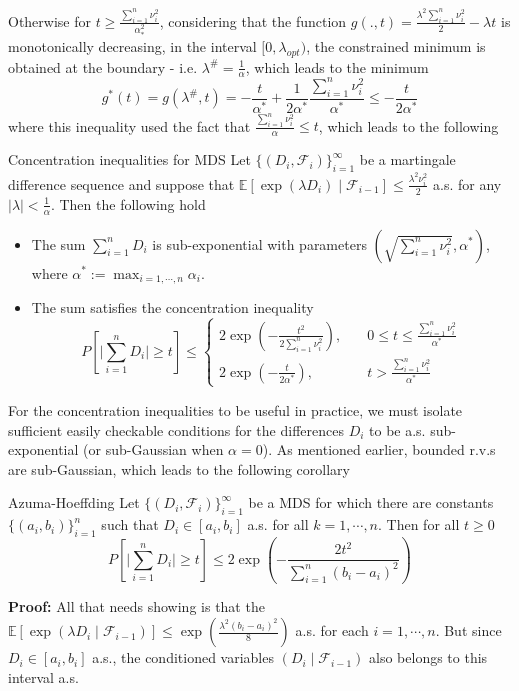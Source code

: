 \documentclass[10pt,handout,english]{beamer}
\newcommand{\E}{\mathbb{E}}
\newcommand{\F}{\mathcal{F}}
\newcommand{\1}{\mathbbm{1}}
\begin{document}
\begin{frame}[allowframebreaks]
Otherwise for $t\geq\frac{\sum_{i=1}^n\nu_i^2}{\alpha_*^2}$, considering that the function $g(.,t)=\frac{\lambda^2\sum_{i=1}^{n}\nu_i^2}{2}-\lambda t$ is monotonically decreasing, in the interval $[0,\lambda_{opt})$, the constrained minimum
is obtained at the boundary - i.e. $\lambda^\#=\frac{1}{\alpha}$, which leads to the minimum
\[
g^*(t)=g(\lambda^\#,t)=-\frac{t}{\alpha^*}+\frac{1}{2\alpha^*}\frac{\sum_{i=1}^{n}\nu_i^2}{\alpha^*}\leq-\frac{t}{2\alpha^*}
\]
where this inequality used the fact that $\frac{\sum_{i=1}^{n}\nu_i^2}{\alpha}\leq t$, which leads to the following
\begin{block}{Concentration inequalities for MDS}
Let $\{(D_i,\F_i)\}_{i=1}^{\infty}$ be a martingale difference sequence and suppose that $\E[\exp(\lambda D_i)\mid\F_{i-1}]\leq\frac{\lambda^2\nu_i^2}{2}$ a.s. for any $\lvert\lambda\rvert<\frac{1}{\alpha}$. Then the following hold
\begin{itemize}
\item The sum $\sum_{i=1}^{n}D_i$ is sub-exponential with parameters $\left(\sqrt{\sum_{i=1}^{n}\nu_i^2},\alpha^*\right)$, where $\alpha^*:=\max_{i=1,\cdots,n}\alpha_i$.
\item The sum satisfies the concentration inequality
\[
P\left[\biggl\vert \sum\limits_{i=1}^nD_i\biggr\vert\geq t\right]\leq
\begin{cases}
2\exp\left(-\frac{t^2}{2\sum_{i=1}^{n}\nu_i^2}\right),\quad &0\leq t\leq\frac{\sum_{i=1}^{n}\nu_i^2}{\alpha^*}\\
2\exp\left(-\frac{t}{2\alpha^*}\right),\quad &t>\frac{\sum_{i=1}^{n}\nu_i^2}{\alpha^*}
\end{cases}
\]
\end{itemize}
\end{block}
For the concentration inequalities to be useful in practice, we must isolate sufficient easily checkable conditions for the differences $D_i$ to be a.s. sub-exponential (or sub-Gaussian when $\alpha=0$). As mentioned earlier, bounded r.v.s are sub-Gaussian, which leads to the following corollary
\begin{block}{Azuma-Hoeffding}
Let $\{(D_i,\F_i)\}_{i=1}^{\infty}$ be a MDS for which there are constants $\{(a_i,b_i)\}_{i=1}^n$ such that $D_i\in[a_i,b_i]$ a.s. for all $k=1,\cdots,n$. Then for all $t\geq0$
\[
P\left[\biggl\vert\sum\limits_{i=1}^{n}D_i\biggr\vert\geq t\right]\leq2\exp\left(-\frac{2t^2}{\sum_{i=1}^{n}(b_i-a_i)^2}\right)
\]
\end{block}

\textbf{Proof:}
All that needs showing is that the $\E[\exp(\lambda D_i\mid\F_{i-1})]\leq\exp\left(\frac{\lambda^2(b_i-a_i)^2}{8}\right)$ a.s. for each $i=1,\cdots,n$. But since $D_i\in[a_i,b_i]$ a.s., the conditioned variables $(D_i\mid\F_{i-1})$ also belongs to this interval a.s.
\end{frame}
\end{document}
